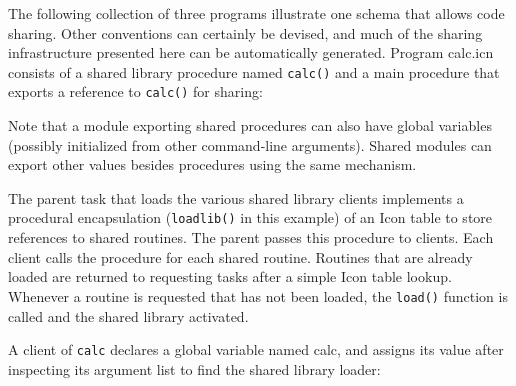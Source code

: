 The following collection of three programs illustrate one schema that allows
code sharing. Other conventions can certainly be devised, and much of the
sharing infrastructure presented here can be automatically generated. Program
calc.icn consists of a shared library procedure named {\texttt{calc()}} and a
main procedure that exports a reference to {\texttt{calc()}} for sharing:


Note that a module exporting shared procedures can also have global
variables (possibly initialized from other command-line arguments).
Shared modules can export other values besides procedures using the
same mechanism.

The parent task that loads the various shared library clients implements
a procedural encapsulation ({\texttt{loadlib()}} in
this example) of an Icon table to store references to shared routines.
The parent passes this procedure to clients. Each client calls the
procedure for each shared routine. Routines that are already loaded are
returned to requesting tasks after a simple Icon table lookup. Whenever
a routine is requested that has not been loaded, the
{\texttt{load()}} function is called and the shared
library activated. 


A client of {\texttt{calc}} declares a global variable named {\textrm{calc}},
and assigns its value after inspecting its argument list to find the shared
library loader:

